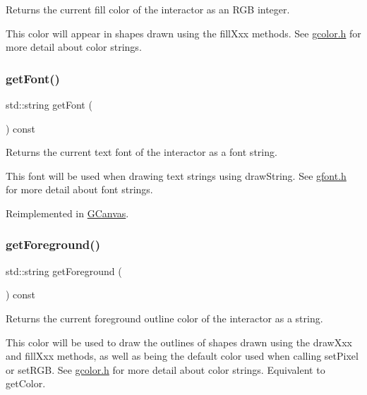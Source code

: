 Returns the current fill color of the interactor as an R\+GB integer. 

This color will appear in shapes drawn using the fill\+Xxx methods. See \mbox{\hyperlink{gcolor_8h_source}{gcolor.\+h}} for more detail about color strings. \mbox{\label{classGDrawingSurface_a894a5502900794eeb27d084c21f1d77d}} 
\subsubsection{\texorpdfstring{get\+Font()}{getFont()}}
{\footnotesize\ttfamily std\+::string get\+Font (\begin{DoxyParamCaption}{ }\end{DoxyParamCaption}) const\hspace{0.3cm}{\ttfamily [virtual]}}



Returns the current text font of the interactor as a font string. 

This font will be used when drawing text strings using draw\+String. See \mbox{\hyperlink{gfont_8h_source}{gfont.\+h}} for more detail about font strings. 

Reimplemented in \mbox{\hyperlink{classGCanvas_aa0829769ac6325b5c58d27c8e363cb78}{G\+Canvas}}.

\mbox{\label{classGDrawingSurface_a4fa2d8b0192a3a5b4af4bbfe71194d03}} 
\subsubsection{\texorpdfstring{get\+Foreground()}{getForeground()}}
{\footnotesize\ttfamily std\+::string get\+Foreground (\begin{DoxyParamCaption}{ }\end{DoxyParamCaption}) const\hspace{0.3cm}{\ttfamily [virtual]}}



Returns the current foreground outline color of the interactor as a string. 

This color will be used to draw the outlines of shapes drawn using the draw\+Xxx and fill\+Xxx methods, as well as being the default color used when calling set\+Pixel or set\+R\+GB. See \mbox{\hyperlink{gcolor_8h_source}{gcolor.\+h}} for more detail about color strings. Equivalent to get\+Color. \mbox{\label{classGDrawingSurface_ac3b12ab385a6ef9ae90fc879860ba726}} 

